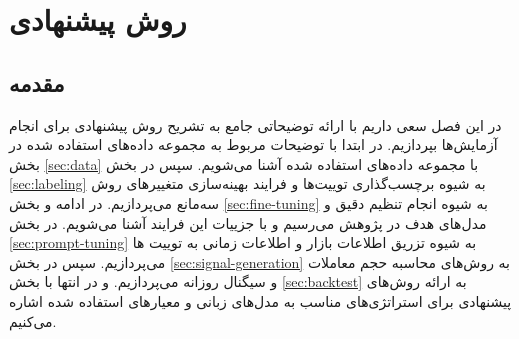 \chapter{روش پیشنهادی}
\label{chp:proposed_method}
\section{مقدمه}
در این فصل سعی داریم با ارائه توضیحاتی جامع به تشریح روش پیشنهادی برای انجام آزمایش‌ها بپردازیم. در ابتدا با توضیحات مربوط به مجموعه داده‌های استفاده شده در بخش \ref{sec:data} با مجموعه داده‌های استفاده شده آشنا می‌شویم. سپس در بخش \ref{sec:labeling} به شیوه برچسب‌گذاری توییت‌ها و فرایند بهینه‌سازی متغییر‌های روش سه‌مانع می‌پردازیم. در ادامه و بخش \ref{sec:fine-tuning} به شیوه انجام تنظیم دقیق و مدل‌های هدف در پژوهش می‌رسیم و با جزيیات این فرایند آشنا می‌شویم. در بخش \ref{sec:prompt-tuning} به شیوه تزریق اطلاعات بازار و اطلاعات زمانی به توییت ها می‌پردازیم. سپس در بخش \ref{sec:signal-generation} به روش‌های محاسبه حجم معاملات و سیگنال روزانه می‌پردازیم. و در انتها با بخش \ref{sec:backtest} به ارائه روش‌های پیشنهادی برای استراتژی‌های مناسب به مدل‌های زبانی و معیار‌های استفاده شده اشاره می‌کنیم.  
